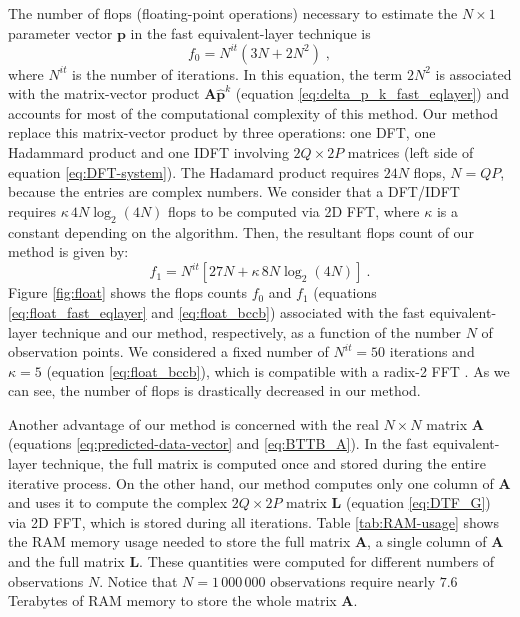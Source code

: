 The number of flops (floating-point operations) necessary to estimate the 
$N \times 1$ parameter vector $\mathbf{p}$ in the fast equivalent-layer technique 
\citep{siqueira-etal2017} is
\begin{equation}
f_{0} = N^{it} (3N + 2N^{2}) \; ,
\label{eq:float_fast_eqlayer}
\end{equation}
where $N^{it}$ is the number of iterations. In this equation, the term $2N^2$ is associated 
with the matrix-vector product $\mathbf{A} \hat{\mathbf{p}}^{k}$ (equation 
\ref{eq:delta_p_k_fast_eqlayer}) and accounts for most of the computational complexity 
of this method.
Our method replace this matrix-vector product by three operations: 
one DFT, one Hadammard product and one IDFT involving $2Q \times 2P$ matrices 
(left side of equation \ref{eq:DFT-system}). 
The Hadamard product requires $24N$ flops, $N = QP$, because the entries are 
complex numbers.
We consider that a DFT/IDFT requires $\kappa \, 4N \log_{2}(4N)$ flops to be computed via 2D FFT, 
where $\kappa$ is a constant depending on the algorithm. 
Then, the resultant flops count of our method is given by:
\begin{equation}
f_{1} = N^{it} \left[ 27N + \kappa \, 8N \log_{2}(4N) \right] \: .
\label{eq:float_bccb}
\end{equation}
Figure \ref{fig:float} shows the flops counts $f_{0}$ and $f_{1}$ (equations \ref{eq:float_fast_eqlayer}
and \ref{eq:float_bccb}) associated with the fast equivalent-layer technique \citep{siqueira-etal2017} and 
our method, respectively, as a function of the number $N$ of observation points. 
We considered a fixed number of $N^{it} = 50$ iterations and $\kappa = 5$ (equation \ref{eq:float_bccb}),
which is compatible with a radix-2 FFT \citep[][ p. 16]{vanloan1992}.
As we can see, the number of flops is drastically decreased in our method.

Another advantage of our method is concerned with the real $N \times N$ matrix $\mathbf{A}$ 
(equations \ref{eq:predicted-data-vector} and \ref{eq:BTTB_A}).
In the fast equivalent-layer technique, the full matrix 
is computed once and stored during the entire iterative process.
On the other hand, our method computes only one column of $\mathbf{A}$ 
and uses it to compute the complex $2Q \times 2P$ matrix $\mathbf{L}$ 
(equation \ref{eq:DTF_G}) via 2D FFT, which is stored during all iterations.
Table \ref{tab:RAM-usage} shows the RAM memory usage needed to store the 
full matrix $\mathbf{A}$, a single column of $\mathbf{A}$ and the full matrix 
$\mathbf{L}$. These quantities were computed for different numbers of observations $N$. 
Notice that $N = 1\,000\,000$ observations require nearly $7.6$ Terabytes of RAM memory 
to store the whole matrix $\mathbf{A}$.

